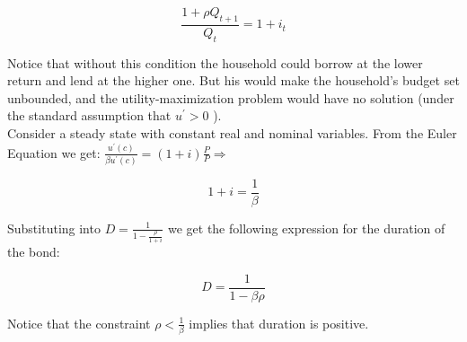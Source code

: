 \documentclass[10pt]{article}
\begin{document}
\begin{equation*}
\frac{1+\rho Q_{t+1}}{Q_{t}}=1+i_{t}
\end{equation*}

Notice that without this condition the household could borrow at the lower return and lend at the higher one. But his would make the household's budget set unbounded, and the utility-maximization problem would have no solution (under the standard assumption that $u^{\prime}>0$ ).\\
Consider a steady state with constant real and nominal variables. From the Euler Equation we get: $\frac{u^{\prime}(c)}{\beta u^{\prime}(c)}=(1+i) \frac{P}{P} \Rightarrow$

\begin{equation*}
1+i=\frac{1}{\beta}
\end{equation*}

Substituting into $D=\frac{1}{1-\frac{\rho}{1+i}}$ we get the following expression for the duration of the bond:

\begin{equation*}
D=\frac{1}{1-\beta \rho}
\end{equation*}

Notice that the constraint $\rho<\frac{1}{\beta}$ implies that duration is positive.
\end{document}

